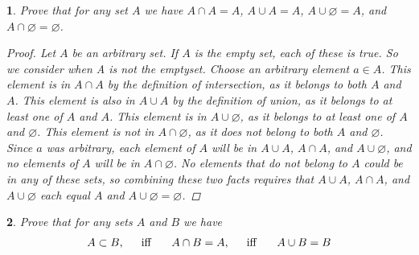 \documentclass{book}
\renewcommand{\emptyset}{\varnothing}
\newtheorem{minorEx}{}[section]
\begin{document}
            \begin{minorEx}%
            Prove that for any set $A$ we have $ A \cap A = A$, $A \cup A = A$, $A \cup \emptyset = A$, and $A \cap \emptyset = \emptyset$.
            \begin{proof}
            Let $A$ be an arbitrary set. If $A$ is the empty set, each of these is true. So we consider when A is not the emptyset. Choose an arbitrary element $a \in A$. This element is in $A \cap A$ by the definition of intersection, as it belongs to both $A$ and $A$. This element is also in $A \cup A$ by the definition of union, as it belongs to at least one of $A$ and $A$. This element is in $A \cup \emptyset$, as it belongs to at least one of $A$ and $\emptyset$. This element is not in $A \cap \emptyset$, as it does not belong to both $A$ and $\emptyset$. Since $a$ was arbitrary, each element of $A$ will be in $A \cup A$, $A \cap A$, and $A \cup \emptyset$, and no elements of $A$ will be in $A \cap \emptyset$. No elements that do not belong to $A$ could be in any of these sets, so combining these two facts requires that $A \cup A$, $A \cap A$, and $A \cup \emptyset$ each equal $A$ and $A \cup \emptyset = \emptyset$.
            \end{proof}
            \end{minorEx}
            \begin{minorEx}%
				Prove that for any sets $A$ and $B$ we have $$A \subset B, \hspace{15pt} \text{\normalfont iff } \hspace{15pt} A \cap B = A, \hspace{15pt} \text{\normalfont iff } \hspace{15pt} A \cup B = B$$
			\end{minorEx}
\end{document}
